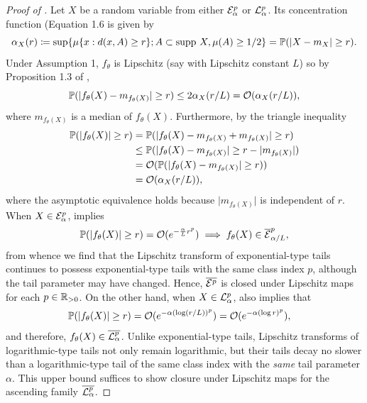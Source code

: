 \documentclass[thesis.tex]{subfiles}
\begin{document}
\begin{proof}[Proof of ]
  \label{proof:distn_class_closed}
  Let $X$ be a random variable from either $\mathcal{E}_\alpha^p$
  or $\mathcal{L}_\alpha^p$.
  Its concentration function
  (Equation 1.6 \citet{ledoux2001concentration}
  is given by
  \[
    \alpha_X(r)
    \coloneqq \sup \{ \mu\{x : d(x,A) \geq r\}; A \subset \text{supp}~X, \mu(A) \geq 1/2\}
    = \mathbb{P}(\lvert X - m_X \rvert \geq r) .
  \]
  Under Assumption 1, $f_\theta$ is Lipschitz (say with Lipschitz
  constant $L$) so by Proposition 1.3 of \citet{ledoux2001concentration},
  \[
    \mathbb{P}(\lvert f_\theta(X) - m_{f_\theta(X)}\rvert \geq r)
    \leq 2 \alpha_X(r/L)
    = \mathcal{O}(\alpha_X(r/L)),
  \]
  where $m_{f_\theta(X)}$ is a median of $f_\theta(X)$.
  Furthermore, by the triangle inequality
  \begin{align}
    \mathbb{P}(\lvert f_\theta(X) \rvert \geq r)
    &= \mathbb{P}(\lvert f_\theta(X) - m_{f_\theta(X)} + m_{f_\theta(X)} \rvert \geq r) \nonumber\\
    &\leq \mathbb{P}(\lvert f_\theta(X) - m_{f_\theta(X)}\rvert \geq r - \lvert m_{f_\theta(X)}\rvert ) \nonumber\\
    &= \mathcal{O}(\mathbb{P}(\lvert f_\theta(X) - m_{f_\theta(X)}\rvert \geq r)) \nonumber\\
    &= \mathcal{O}(\alpha_X(r/L)) ,
    \label{eq:pushforward-conc-fn}
  \end{align}
  where the asymptotic equivalence holds because $\lvert m_{f_\theta(X)} \rvert$ is independent of $r$.
  When $X \in \mathcal{E}_\alpha^p$,  implies
  \[
    \mathbb{P}(\lvert f_\theta(X) \rvert \geq r)
    = \mathcal{O}(e^{-\frac{\alpha}{L} r^p}) \implies f_\theta(X) \in \overline{\mathcal{E}}_{\alpha/L}^p,
  \]
  from whence we find that the Lipschitz transform of exponential-type
  tails continues to possess exponential-type tails with the same
  class index $p$, although the tail parameter may have changed. Hence,
  $\overline{\mathcal{E}^p}$ is closed under Lipschitz maps for each $p \in \mathbb{R}_{>0}$.
  On the other hand, when $X \in \mathcal{L}_\alpha^p$,  also implies that
  \begin{align*}
    \mathbb{P}(\lvert f_\theta(X) \rvert \geq r)
    &= \mathcal{O}(e^{-\alpha (\log (r/L))^p})
    = \mathcal{O}(e^{-\alpha (\log r)^p}),
  \end{align*}
  and therefore, $f_\theta(X) \in \overline{\mathcal{L}_\alpha^p}$.
  Unlike exponential-type tails, Lipschitz transforms of
  logarithmic-type tails not only remain logarithmic, but
  their tails decay no slower than a logarithmic-type tail
  of the same class index with the \emph{same} tail parameter $\alpha$.
  This upper bound suffices to show closure under Lipschitz maps for the
  ascending family $\overline{\mathcal{L}_\alpha^p}$.
\end{proof}
\end{document}
